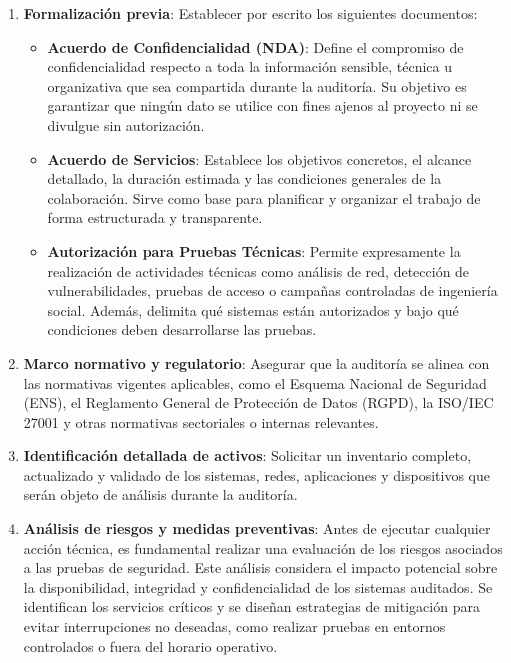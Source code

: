 \documentclass[a4paper, 11pt]{article}
\begin{document}
\begin{enumerate}
\item \textbf{Formalización previa}: Establecer por escrito los siguientes documentos:

\begin{itemize}
\item \textbf{Acuerdo de Confidencialidad (NDA)}: Define el compromiso de confidencialidad respecto a toda la información sensible, técnica u organizativa que sea compartida durante la auditoría. Su objetivo es garantizar que ningún dato se utilice con fines ajenos al proyecto ni se divulgue sin autorización.

\item \textbf{Acuerdo de Servicios}: Establece los objetivos concretos, el alcance detallado, la duración estimada y las condiciones generales de la colaboración. Sirve como base para planificar y organizar el trabajo de forma estructurada y transparente.

\item \textbf{Autorización para Pruebas Técnicas}: Permite expresamente la realización de actividades técnicas como análisis de red, detección de vulnerabilidades, pruebas de acceso o campañas controladas de ingeniería social. Además, delimita qué sistemas están autorizados y bajo qué condiciones deben desarrollarse las pruebas.
\end{itemize}

\item \textbf{Marco normativo y regulatorio}: Asegurar que la auditoría se alinea con las normativas vigentes aplicables, como el Esquema Nacional de Seguridad (ENS), el Reglamento General de Protección de Datos (RGPD), la ISO/IEC 27001 y otras normativas sectoriales o internas relevantes.

\item \textbf{Identificación detallada de activos}: Solicitar un inventario completo, actualizado y validado de los sistemas, redes, aplicaciones y dispositivos que serán objeto de análisis durante la auditoría.

\item \textbf{Análisis de riesgos y medidas preventivas}: Antes de ejecutar cualquier acción técnica, es fundamental realizar una evaluación de los riesgos asociados a las pruebas de seguridad. Este análisis considera el impacto potencial sobre la disponibilidad, integridad y confidencialidad de los sistemas auditados. Se identifican los servicios críticos y se diseñan estrategias de mitigación para evitar interrupciones no deseadas, como realizar pruebas en entornos controlados o fuera del horario operativo.


\end{enumerate}
\end{document}
